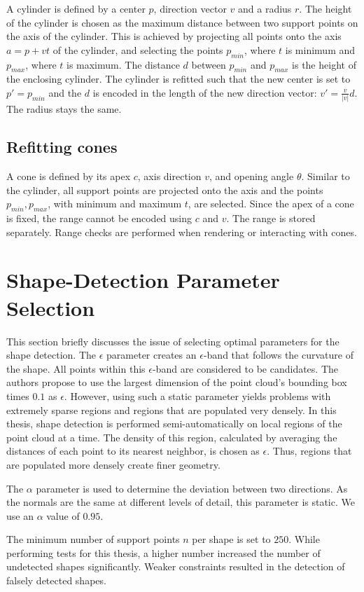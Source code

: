 A cylinder is defined by a center $p$, direction vector $v$ and a radius $r$. The height of the cylinder is chosen as the maximum distance between two support points on the axis of the cylinder. This is achieved by projecting all points onto the axis $a = p + vt$ of the cylinder, and selecting the points $p_{min}$, where $t$ is minimum and $p_{max}$, where $t$ is maximum. The distance $d$ between $p_{min}$ and $p_{max}$ is the height of the enclosing cylinder. The cylinder is refitted such that the new center is set to $p' = p_{min}$ and the $d$ is encoded in the length of the new direction vector: $v' = \frac{v}{|v|}d$. The radius stays the same. 


\subsection{Refitting cones}

A cone is defined by its apex $c$, axis direction $v$, and opening angle $\theta$. Similar to the cylinder, all support points are projected onto the axis and the points $p_{min}, p_{max}$, with minimum and maximum $t$, are selected. Since the apex of a cone is fixed, the range cannot be encoded using $c$ and $v$. The range is stored separately. Range checks are performed when rendering or interacting with cones. 


\section{Shape-Detection Parameter Selection}
\label{sec:shapeDetectionParameterSelection}

This section briefly discusses the issue of selecting optimal parameters for the shape detection. The $\epsilon$ parameter creates an $\epsilon$-band that follows the curvature of the shape. All points within this $\epsilon$-band are considered to be candidates. The authors propose to use the largest dimension of the point cloud's bounding box times $0.1$ as $\epsilon$. However, using such a static parameter yields problems with extremely sparse regions and regions that are populated very densely. In this thesis, shape detection is performed semi-automatically on local regions of the point cloud at a time. The density of this region, calculated by averaging the distances of each point to its nearest neighbor, is chosen as $\epsilon$. Thus, regions that are populated more densely create finer geometry. 

The $\alpha$ parameter is used to determine the deviation between two directions. As the normals are the same at different levels of detail, this parameter is static. We use an $\alpha$ value of $0.95$. 

The minimum number of support points $n$ per shape is set to $250$. While performing tests for this thesis, a higher number increased the number of undetected shapes significantly. Weaker constraints resulted in the detection of falsely detected shapes. 